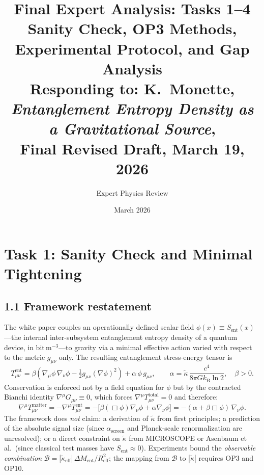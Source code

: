 \documentclass[12pt,letterpaper]{article}
\title{\textbf{Final Expert Analysis: Tasks 1--4}\\[6pt]
\large Sanity Check, OP3 Methods, Experimental Protocol, and Gap Analysis\\
\normalsize Responding to: K.\ Monette, \textit{Entanglement Entropy Density as a Gravitational Source},\\
\normalsize Final Revised Draft, March 19, 2026}
\author{Expert Physics Review}
\date{March 2026}
\theoremstyle{plain}
\theoremstyle{definition}
\newcommand{\kB}{k_{\mathrm{B}}}
\newcommand{\kt}{\tilde{\kappa}}
\newcommand{\kteff}{\tilde{\kappa}_{\mathrm{eff}}}
\newcommand{\Sent}{S_{\mathrm{ent}}}
\newcommand{\Ment}{M_{\mathrm{ent}}}
\newcommand{\asc}{\alpha_{\mathrm{screen}}}
\newcommand{\Bobs}{\mathcal{B}}
\begin{document}
\maketitle\tableofcontents\newpage

\section*{Task 1: Sanity Check and Minimal Tightening}

\subsection*{1.1 Framework restatement}

The white paper couples an operationally defined scalar field $\phi(x) \equiv \Sent(x)$---the internal inter-subsystem entanglement entropy density of a quantum device, in bit\,m$^{-3}$---to gravity via a minimal effective action varied with respect to the metric $g_{\mu\nu}$ only.  The resulting entanglement stress-energy tensor is
\begin{equation}
  T^{\mathrm{ent}}_{\mu\nu}
  = \beta\!\left(\nabla_\mu\phi\,\nabla_\nu\phi
    - \tfrac{1}{2}g_{\mu\nu}(\nabla\phi)^2\right)
  + \alpha\,\phi\,g_{\mu\nu},
  \qquad
  \alpha = \kt\,\frac{c^4}{8\pi G\kB\ln 2},
  \quad \beta > 0.
  \label{eq:Tent}
\end{equation}
Conservation is enforced not by a field equation for $\phi$ but by the contracted Bianchi identity $\nabla^\mu G_{\mu\nu} \equiv 0$, which forces $\nabla^\mu T^{\mathrm{total}}_{\mu\nu} = 0$ and therefore:
\begin{equation}
  \nabla^\mu T^{\mathrm{matter}}_{\mu\nu}
  = -\nabla^\mu T^{\mathrm{ent}}_{\mu\nu}
  = -\bigl[\beta(\Box\phi)\nabla_\nu\phi + \alpha\nabla_\nu\phi\bigr]
  = -(\alpha + \beta\Box\phi)\,\nabla_\nu\phi.
  \label{eq:fifth-force-full}
\end{equation}
The framework does \emph{not} claim: a derivation of $\kt$ from first principles; a prediction of the absolute signal size (since $\asc$ and Planck-scale renormalization are unresolved); or a direct constraint on $\kt$ from MICROSCOPE or Asenbaum et al.\ (since classical test masses have $\Sent \approx 0$).  Experiments bound the \emph{observable combination} $\Bobs = |\kteff|\,\Delta\Ment/R_{\mathrm{eff}}^2$; the mapping from $\Bobs$ to $|\kt|$ requires OP3 and OP10.
\end{document}
